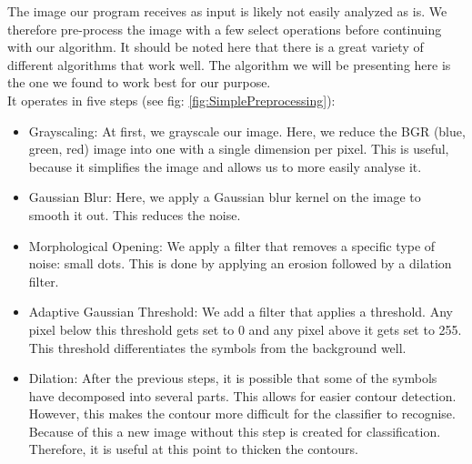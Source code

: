 \documentclass[12pt]{article}
\begin{document}
		The image our program receives as input is likely not easily analyzed as is.
		We therefore pre-process the image with a few select operations before continuing with our algorithm.
		It should be noted here that there is a great variety of different algorithms that work well.
		The algorithm we will be presenting here is the one we found to work best for our purpose.\\
		It operates in five steps (see fig: \ref{fig:SimplePreprocessing}):
		\begin{itemize}
			\item Grayscaling: At first, we grayscale our image.
			Here, we reduce the BGR (blue, green, red) image into one with a single dimension per pixel.
			This is useful, because it simplifies the image and allows us to more easily analyse it.
			\item Gaussian Blur: Here, we apply a Gaussian blur kernel on the image to smooth it out. This reduces the noise.
			\item Morphological Opening: We apply a filter that removes a specific type of noise: small dots. This is done by applying an erosion followed by a dilation filter. %
			\item Adaptive Gaussian Threshold: We add a filter that applies a threshold. 
			Any pixel below this threshold gets set to 0 and any pixel above it gets set to 255. %
			This threshold differentiates the symbols from the background well.
			\item Dilation: After the previous steps, it is possible that some of the symbols have decomposed into several parts.
			This allows for easier contour detection.
			However, this makes the contour more difficult for the classifier to recognise.
			Because of this a new image without this step is created for classification. %
			Therefore, it is useful at this point to thicken the contours.
		\end{itemize}
			
	
\end{document}
